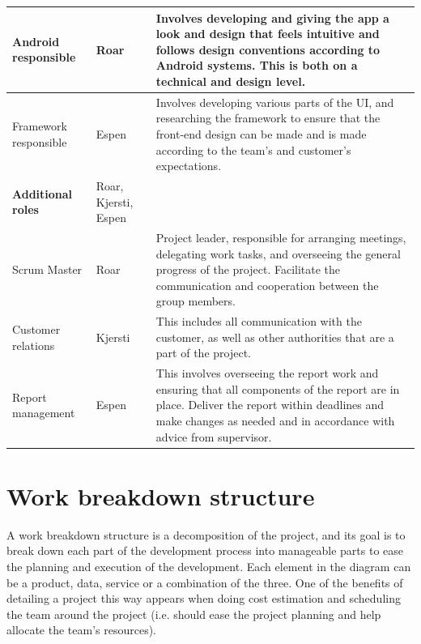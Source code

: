 \begin{table}[!h]
\begin{tabular}{ | p{2.5cm} | p{2.8cm} | p{12cm} |}
			Android responsible & Roar & Involves developing and giving the app a look and design that feels intuitive and follows design conventions according to Android systems. This is both on a  technical and design level. \\ \hline
			
			Framework responsible & Espen & Involves developing various parts of the UI, and researching the framework to ensure that the front-end design can be made and is made according to the team's and customer's expectations. \\ \hline
			
			\textbf{Additional roles} & Roar, Kjersti, Espen & \\ \hline
			
			Scrum Master & Roar & Project leader, responsible for arranging meetings, delegating work tasks, and overseeing the general progress of the project. Facilitate the communication and cooperation between the group members. \\ \hline
			
			Customer relations & Kjersti & This includes all communication with the customer, as well as other authorities that are a part of the project. \\ \hline
			
			Report management & Espen & This involves overseeing the report work and ensuring that all components of the report are in place. Deliver the report within deadlines and make changes as needed and in accordance with advice from supervisor. \\ \hline
		\end{tabular}
	\label{Tab:roles}
\end{table}

\section{Work breakdown structure}

A work breakdown structure is a decomposition of the project, and its goal is to break down each part of the development process into manageable parts to ease the planning and execution of the development. Each element in the diagram can be a product, data, service or a combination of the three. One of the benefits of detailing a project this way appears when doing cost estimation and scheduling the team around the project (i.e. should ease the project planning and help allocate the team's resources).\newline

